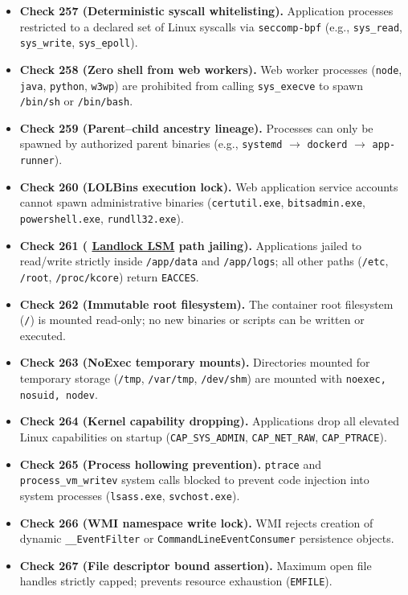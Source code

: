 \documentclass{portalciencia}
\newcommand{\linklandlock}{%
  \href{https://docs.kernel.org/userspace-api/landlock.html}{Landlock LSM}%
}
\theoremstyle{plain}
\theoremstyle{definition}
\begin{document}
\begin{itemize}
  \item \textbf{Check 257 (Deterministic syscall whitelisting).} Application processes restricted to a declared set of Linux syscalls via \texttt{seccomp-bpf} (e.g., \texttt{sys\_read}, \texttt{sys\_write}, \texttt{sys\_epoll}).
  \item \textbf{Check 258 (Zero shell from web workers).} Web worker processes (\texttt{node}, \texttt{java}, \texttt{python}, \texttt{w3wp}) are prohibited from calling \texttt{sys\_execve} to spawn \texttt{/bin/sh} or \texttt{/bin/bash}.
  \item \textbf{Check 259 (Parent--child ancestry lineage).} Processes can only be spawned by authorized parent binaries (e.g., \texttt{systemd} $\to$ \texttt{dockerd} $\to$ \texttt{app-runner}).
  \item \textbf{Check 260 (LOLBins execution lock).} Web application service accounts cannot spawn administrative binaries (\texttt{certutil.exe}, \texttt{bitsadmin.exe}, \texttt{powershell.exe}, \texttt{rundll32.exe}).
  \item \textbf{Check 261 (\linklandlock{} path jailing).} Applications jailed to read/write strictly inside \texttt{/app/data} and \texttt{/app/logs}; all other paths (\texttt{/etc}, \texttt{/root}, \texttt{/proc/kcore}) return \texttt{EACCES}.
  \item \textbf{Check 262 (Immutable root filesystem).} The container root filesystem (\texttt{/}) is mounted read-only; no new binaries or scripts can be written or executed.
  \item \textbf{Check 263 (NoExec temporary mounts).} Directories mounted for temporary storage (\texttt{/tmp}, \texttt{/var/tmp}, \texttt{/dev/shm}) are mounted with \texttt{noexec, nosuid, nodev}.
  \item \textbf{Check 264 (Kernel capability dropping).} Applications drop all elevated Linux capabilities on startup (\texttt{CAP\_SYS\_ADMIN}, \texttt{CAP\_NET\_RAW}, \texttt{CAP\_PTRACE}).
  \item \textbf{Check 265 (Process hollowing prevention).} \texttt{ptrace} and \texttt{process\_vm\_writev} system calls blocked to prevent code injection into system processes (\texttt{lsass.exe}, \texttt{svchost.exe}).
  \item \textbf{Check 266 (WMI namespace write lock).} WMI rejects creation of dynamic \texttt{\_\_EventFilter} or \texttt{CommandLineEventConsumer} persistence objects.
  \item \textbf{Check 267 (File descriptor bound assertion).} Maximum open file handles strictly capped; prevents resource exhaustion (\texttt{EMFILE}).

\end{itemize}
\end{document}

